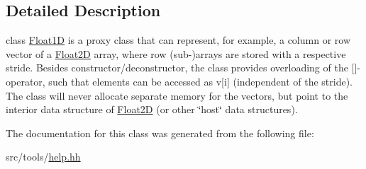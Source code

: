 \subsection{Detailed Description}
class \hyperlink{classFloat1D}{Float1\-D} is a proxy class that can represent, for example, a column or row vector of a \hyperlink{classFloat2D}{Float2\-D} array, where row (sub-\/)arrays are stored with a respective stride. Besides constructor/deconstructor, the class provides overloading of the \mbox{[}\mbox{]}-\/operator, such that elements can be accessed as v\mbox{[}i\mbox{]} (independent of the stride). The class will never allocate separate memory for the vectors, but point to the interior data structure of \hyperlink{classFloat2D}{Float2\-D} (or other \char`\"{}host\char`\"{} data structures). 

The documentation for this class was generated from the following file\-:\begin{DoxyCompactItemize}
\item 
src/tools/\hyperlink{help_8hh}{help.\-hh}\end{DoxyCompactItemize}
